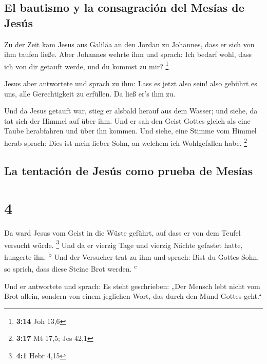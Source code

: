 \hypertarget{el-bautismo-y-la-consagraciuxf3n-del-mesuxedas-de-jesuxfas}{%
\subsection{El bautismo y la consagración del Mesías de
Jesús}\label{el-bautismo-y-la-consagraciuxf3n-del-mesuxedas-de-jesuxfas}}

 Zu der Zeit kam Jesus aus Galiläa an den Jordan zu
Johannes, dass er sich von ihm taufen ließe.  Aber
Johannes wehrte ihm und sprach: Ich bedarf wohl, dass ich von dir
getauft werde, und du kommst zu mir? \footnote{\textbf{3:14} Joh 13,6}

 Jesus aber antwortete und sprach zu ihm: Lass es jetzt
also sein! also gebührt es uns, alle Gerechtigkeit zu erfüllen. Da ließ
er's ihm zu.

 Und da Jesus getauft war, stieg er alsbald herauf aus
dem Wasser; und siehe, da tat sich der Himmel auf über ihm. Und er sah
den Geist Gottes gleich als eine Taube herabfahren und über ihn kommen.
 Und siehe, eine Stimme vom Himmel herab sprach: Dies ist
mein lieber Sohn, an welchem ich Wohlgefallen habe. \footnote{\textbf{3:17}
  Mt 17,5; Jes 42,1}

\hypertarget{la-tentaciuxf3n-de-jesuxfas-como-prueba-de-mesuxedas}{%
\subsection{La tentación de Jesús como prueba de
Mesías}\label{la-tentaciuxf3n-de-jesuxfas-como-prueba-de-mesuxedas}}

\hypertarget{section-3}{%
\section{4}\label{section-3}}

 Da ward Jesus vom Geist in die Wüste geführt, auf dass er
von dem Teufel versucht würde. \footnote{\textbf{4:1} Hebr 4,15}
 Und da er vierzig Tage und vierzig Nächte gefastet hatte,
hungerte ihn. \textsuperscript{b}  Und der Versucher trat
zu ihm und sprach: Bist du Gottes Sohn, so sprich, dass diese Steine
Brot werden. \textsuperscript{c}

 Und er antwortete und sprach: Es steht geschrieben: „Der
Mensch lebt nicht vom Brot allein, sondern von einem jeglichen Wort, das
durch den Mund Gottes geht.``


